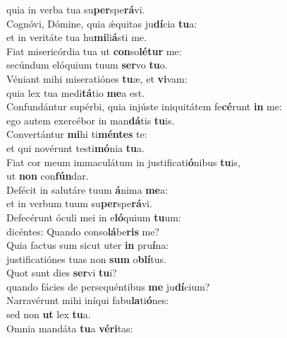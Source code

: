 \evenverse quia in verba tua su\textbf{per}spe\textbf{rá}vi.\\
\oddverse Cognóvi, Dómine, quia ǽquitas ju\textbf{dí}cia \textbf{tu}a:~\*\\
\oddverse et in veritáte tua hu\textbf{mi}li\textbf{á}sti me.\\
\evenverse Fiat misericórdia tua ut \textbf{con}so\textbf{lé}\textbf{tur} me:~\*\\
\evenverse secúndum elóquium tuum \textbf{ser}vo \textbf{tu}o.\\
\oddverse Véniant mihi miseratiónes \textbf{tu}æ, et \textbf{vi}vam:~\*\\
\oddverse quia lex tua medi\textbf{tá}tio \textbf{me}a est.\\
\evenverse Confundántur supérbi, quia injúste iniquitátem fe\textbf{cé}runt \textbf{in} me:~\*\\
\evenverse ego autem exercébor in man\textbf{dá}tis \textbf{tu}is.\\
\oddverse Convertántur \textbf{mi}hi ti\textbf{mén}\textbf{tes} te:~\*\\
\oddverse et qui novérunt testi\textbf{mó}nia \textbf{tu}a.\\
\evenverse Fiat cor meum immaculátum in justificati\textbf{ó}nibus \textbf{tu}is,~\*\\
\evenverse ut \textbf{non} con\textbf{fún}dar.\\
\oddverse Defécit in salutáre tuum \textbf{á}nima \textbf{me}a:~\*\\
\oddverse et in verbum tuum su\textbf{per}spe\textbf{rá}vi.\\
\evenverse Defecérunt óculi mei in e\textbf{ló}quium \textbf{tu}um:~\*\\
\evenverse dicéntes: Quando conso\textbf{lá}be\textbf{ris} me?\\
\oddverse Quia factus sum sicut uter \textbf{in} pru\textbf{í}na:~\*\\
\oddverse justificatiónes tuas non \textbf{sum} o\textbf{blí}tus.\\
\evenverse Quot sunt dies \textbf{ser}vi \textbf{tu}i?~\*\\
\evenverse quando fácies de persequéntibus \textbf{me} ju\textbf{dí}cium?\\
\oddverse Narravérunt mihi iníqui fabu\textbf{la}ti\textbf{ó}nes:~\*\\
\oddverse sed non \textbf{ut} lex \textbf{tu}a.\\
\evenverse Omnia mandáta \textbf{tu}a \textbf{vé}\textbf{ri}tas:~\*\\
